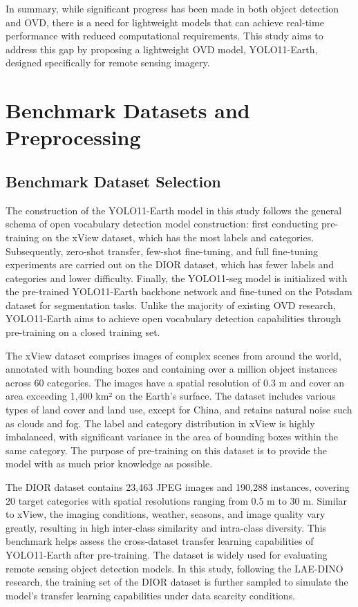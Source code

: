 \documentclass{article}
\begin{document}
In summary, while significant progress has been made in both object  
detection and OVD, there is a need for lightweight models that can  
achieve real-time performance with reduced computational requirements.  
This study aims to address this gap by proposing a lightweight OVD  
model, YOLO11-Earth, designed specifically for remote sensing imagery.

\section{Benchmark Datasets and Preprocessing}

\subsection{Benchmark Dataset Selection}
The construction of the YOLO11-Earth model in this study 
follows the general schema of open vocabulary detection model construction:
first conducting pre-training on the xView dataset, which has the 
most labels and categories. Subsequently, zero-shot transfer, 
few-shot fine-tuning, and full fine-tuning experiments are carried 
out on the DIOR dataset, which has fewer labels and categories 
and lower difficulty. Finally, the YOLO11-seg model is initialized 
with the pre-trained YOLO11-Earth backbone network and fine-tuned 
on the Potsdam dataset for segmentation tasks. Unlike the majority 
of existing OVD research, YOLO11-Earth aims to achieve open vocabulary 
detection capabilities through pre-training on a closed training set.

The xView dataset \cite{lam2018xview} comprises images of complex scenes from around 
the world, annotated with bounding boxes and containing over a 
million object instances across 60 categories. The images have a 
spatial resolution of 0.3 m and cover an area exceeding 1,400 km² 
on the Earth's surface. The dataset includes various types of 
land cover and land use, except for China, and retains natural 
noise such as clouds and fog. The label and category distribution 
in xView is highly imbalanced, with significant variance in the 
area of bounding boxes within the same category. The purpose of 
pre-training on this dataset is to provide the model with as 
much prior knowledge as possible.

The DIOR dataset \cite{li2020object} contains 23,463 JPEG images and 190,288 instances, 
covering 20 target categories with spatial resolutions ranging 
from 0.5 m to 30 m. Similar to xView, the imaging conditions, 
weather, seasons, and image quality vary greatly, resulting in 
high inter-class similarity and intra-class diversity. This benchmark 
helps assess the cross-dataset transfer learning capabilities of 
YOLO11-Earth after pre-training. The dataset is widely used for 
evaluating remote sensing object detection models. In this study, 
following the LAE-DINO research, the training set of the DIOR 
dataset is further sampled to simulate the model's transfer 
learning capabilities under data scarcity conditions.
\end{document}

